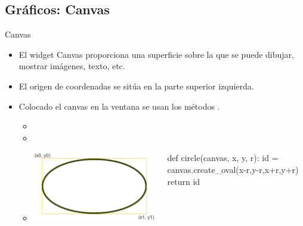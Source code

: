 \documentclass[10pt, envcountsect , spanish]{beamer}
\begin{document}
\subsection{Gráficos: Canvas}



\begin{frame}[fragile]{Canvas}
{} 
\begin{itemize}
\item El widget Canvas proporciona una superficie sobre la que se puede dibujar, mostrar imágenes, texto, etc.
\item El origen de coordenadas se sitúa en la parte superior izquierda.
\item Colocado el canvas en la ventana se usan los métodos .

\begin{itemize}
\item {}
\item {}
\item {}

	\begin{columns}
	\begin{column}{.25\textwidth}
		\includegraphics[height=.2\textheight]{fig/canvas_oval}
	\end{column}
	\begin{column}{.65\textwidth}
\begin{pyverbatim}[][frame=single]
def circle(canvas, x, y, r):
   id = canvas.create_oval(x-r,y-r,x+r,y+r)
   return id
\end{pyverbatim}
	\end{column}
	\end{columns}	
	

\end{itemize}
\end{itemize}
\end{frame}
\end{document}
